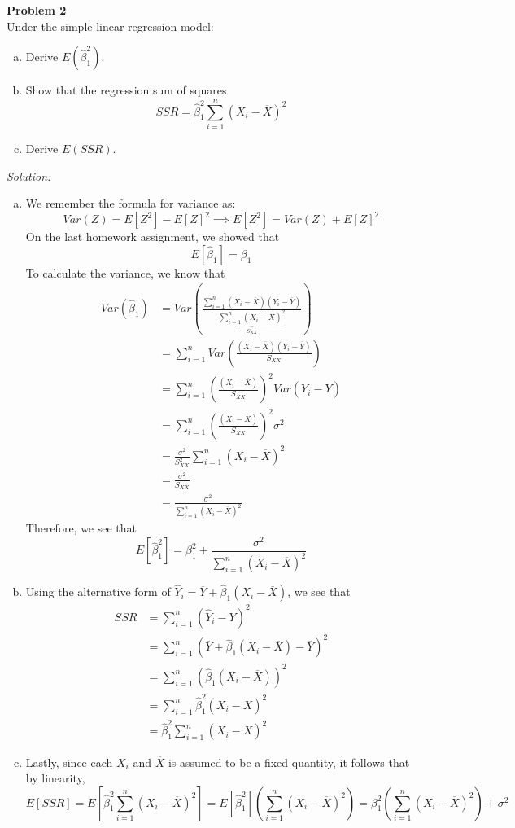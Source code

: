 \documentclass{article}
\newenvironment{problem}[2][Problem]
    { \begin{mdframed}[backgroundcolor=gray!20] \textbf{#1 #2} \\}
    {  \end{mdframed}}
\newenvironment{solution}
    {\textit{Solution:}}
    {}
\begin{document}
\begin{problem}{2}
Under the simple linear regression model:
\begin{enumerate}[(a)]
\item Derive $E(\hat \beta_1^2)$.
\item Show that the regression sum of squares
$$SSR = \hat \beta_1^2 \sum_{i = 1}^n (X_i - \overline X)^2$$
\item Derive $E(SSR)$.
\end{enumerate}
\end{problem}
\begin{solution}
\begin{enumerate}[(a)]
\item We remember the formula for variance as: 
$$Var(Z) = E[Z^2] - E[Z]^2 \implies E[Z^2] = Var(Z) + E[Z]^2$$
On the last homework assignment, we showed that 
$$E[\hat \beta_1] = \beta_1$$
To calculate the variance, we know that 
\begin{align*}
Var(\hat \beta_1) &= Var \left ( \frac{\sum_{i = 1}^n (X_i - \overline X) (Y_i - \overline{Y})}{\underbrace{\sum_{i = 1}^n (X_i - \overline X)^2}_{S_{XX}} } \right)  \\
&= \sum_{i = 1}^n Var \left ( \frac{ (X_i - \overline X) (Y_i - \overline{Y})}{S_{XX}} \right)  \\
&= \sum_{i = 1}^n \left ( \frac{ (X_i - \overline X) }{S_{XX}} \right)^2 Var(Y_i - \overline{Y}) \\
&= \sum_{i = 1}^n \left ( \frac{ (X_i - \overline X) }{S_{XX}} \right)^2 \sigma^2 \\
&= \frac{\sigma^2}{S_{XX}^2} \sum_{i = 1}^n (X_i - \overline X)^2 \\
&= \frac{\sigma^2}{S_{XX}} \\
&= \frac{\sigma^2}{\sum_{i = 1}^n (X_i - \overline X)^2}
\end{align*}
Therefore, we see that 
$$E[\hat \beta_1^2] = \beta_1^2 + \frac{\sigma^2}{ \sum_{i = 1}^n (X_i - \overline X)^2}$$
\item Using the alternative form of $\hat Y_i = \overline{Y} + \hat \beta_1(X_i - \overline X)$, we see that
\begin{align*}
SSR &= \sum_{i = 1}^n (\hat Y_i - \overline{Y})^2 \\
&=  \sum_{i = 1}^n (\overline{Y} + \hat \beta_1 (X_i - \overline{X}) - \overline{Y})^2 \\
&=  \sum_{i = 1}^n (\hat \beta_1 (X_i - \overline{X}))^2 \\
&=  \sum_{i = 1}^n \hat \beta_1^2 (X_i - \overline{X})^2 \\
&= \hat \beta_1^2 \sum_{i = 1}^n (X_i - \overline{X})^2
\end{align*}

\item Lastly, since each $X_i$ and $\overline{X}$ is assumed to be a fixed quantity, it follows that by linearity, 
$$E[SSR] = E[\hat \beta_1^2 \sum_{i = 1}^n (X_i - \overline{X})^2] = E[\hat \beta_1^2]\left(\sum_{i = 1}^n (X_i - \overline{X})^2 \right) = \beta_1^2 \left (\sum_{i = 1}^n (X_i - \overline{X})^2\right) + \sigma^2$$
\end{enumerate}
\end{solution}
\end{document}
